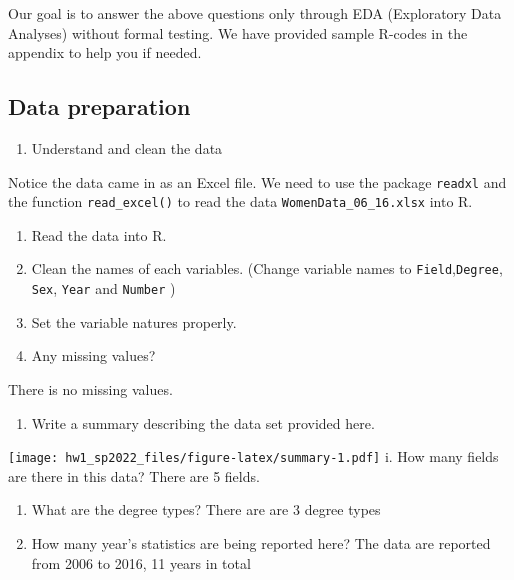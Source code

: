 \documentclass[
]{article}
\providecommand{\tightlist}{%
  \setlength{\itemsep}{0pt}\setlength{\parskip}{0pt}}
\begin{document}
Our goal is to answer the above questions only through EDA (Exploratory
Data Analyses) without formal testing. We have provided sample R-codes
in the appendix to help you if needed.

\hypertarget{data-preparation-1}{%
\subsection{Data preparation}\label{data-preparation-1}}

\begin{enumerate}
\def\labelenumi{\arabic{enumi}.}
\tightlist
\item
  Understand and clean the data
\end{enumerate}

Notice the data came in as an Excel file. We need to use the package
\texttt{readxl} and the function \texttt{read\_excel()} to read the data
\texttt{WomenData\_06\_16.xlsx} into R.

\begin{enumerate}
\def\labelenumi{\roman{enumi}.}
\item
  Read the data into R.
\item
  Clean the names of each variables. (Change variable names to
  \texttt{Field},\texttt{Degree}, \texttt{Sex}, \texttt{Year} and
  \texttt{Number} )
\item
  Set the variable natures properly.
\item
  Any missing values?
\end{enumerate}

There is no missing values.

\begin{enumerate}
\def\labelenumi{\arabic{enumi}.}
\setcounter{enumi}{1}
\tightlist
\item
  Write a summary describing the data set provided here.
\end{enumerate}

\texttt{[image: hw1\_sp2022\_files/figure-latex/summary-1.pdf]} i. How
many fields are there in this data? There are 5 fields.

\begin{enumerate}
\def\labelenumi{\roman{enumi}.}
\setcounter{enumi}{1}
\item
  What are the degree types? There are are 3 degree types
\item
  How many year's statistics are being reported here? The data are
  reported from 2006 to 2016, 11 years in total
\end{enumerate}
\end{document}
